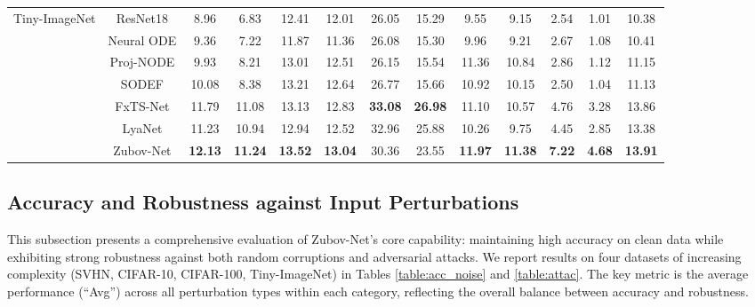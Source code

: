 \documentclass[journal]{IEEEtran}
\begin{document}
\begin{table}[ht]
\begin{tabular}{ccccccccccccc}
		\multirow{6}{*}{Tiny-ImageNet}  & ResNet18   & 8.96           & 6.83           & 12.41          & 12.01          & 26.05          & 15.29          & 9.55           & 9.15           & 2.54          & 1.01          & 10.38          \\
		& Neural ODE & 9.36           & 7.22           & 11.87          & 11.36          & 26.08          & 15.30          & 9.96           & 9.21           & 2.67          & 1.08          & 10.41          \\
		& Proj-NODE  & 9.93           & 8.21           & 13.01          & 12.51          & 26.15          & 15.54          & 11.36          & 10.84          & 2.86          & 1.12          & 11.15          \\
		& SODEF      & 10.08          & 8.38           & 13.21          & 12.64          & 26.77          & 15.66          & 10.92          & 10.15          & 2.50          & 1.04          & 11.13          \\
		& FxTS-Net   & 11.79          & 11.08          & 13.13          & 12.83          & \textbf{33.08} & \textbf{26.98} & 11.10          & 10.57          & 4.76          & 3.28          & 13.86          \\
		& LyaNet     & 11.23          & 10.94          & 12.94          & 12.52          & 32.96          & 25.88          & 10.26          & 9.75           & 4.45          & 2.85          & 13.38          \\
		& Zubov-Net  & \textbf{12.13} & \textbf{11.24} & \textbf{13.52} & \textbf{13.04} & 30.36          & 23.55          & \textbf{11.97} & \textbf{11.38} & \textbf{7.22} & \textbf{4.68} & \textbf{13.91}  \\
		\bottomrule
	\end{tabular}
\end{table}

\subsection{Accuracy and Robustness against Input Perturbations}
\label{sec:exp_main}

This subsection presents a comprehensive evaluation of Zubov-Net's core capability: maintaining high accuracy on clean data while exhibiting strong robustness against both random corruptions and adversarial attacks. We report results on four datasets of increasing complexity (SVHN, CIFAR-10, CIFAR-100, Tiny-ImageNet) in Tables \ref{table:acc_noise} and \ref{table:attac}. The key metric is the average performance (``Avg'') across all perturbation types within each category, reflecting the overall balance between accuracy and robustness.
\end{document}
